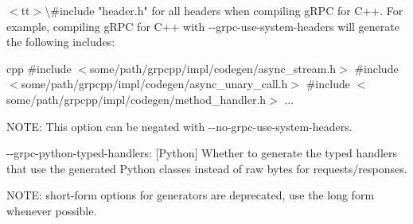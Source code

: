 \begin{DoxyItemize}
$<$tt$>$\textbackslash{}\#include "{}header.\+h"{} for all headers when compiling g\+RPC for C++. For example, compiling g\+RPC for C++ with {\ttfamily -\/-\/grpc-\/use-\/system-\/headers} will generate the following includes\+:

{\ttfamily cpp \#include \texorpdfstring{$<$}{<}some/path/grpcpp/impl/codegen/async\+\_\+stream.\+h\texorpdfstring{$>$}{>} \#include \texorpdfstring{$<$}{<}some/path/grpcpp/impl/codegen/async\+\_\+unary\+\_\+call.\+h\texorpdfstring{$>$}{>} \#include \texorpdfstring{$<$}{<}some/path/grpcpp/impl/codegen/method\+\_\+handler.\+h\texorpdfstring{$>$}{>} ... }

NOTE\+: This option can be negated with {\ttfamily -\/-\/no-\/grpc-\/use-\/system-\/headers}.
\item {\ttfamily -\/-\/grpc-\/python-\/typed-\/handlers}\+: {\ttfamily \mbox{[}Python\mbox{]}} Whether to generate the typed handlers that use the generated Python classes instead of raw bytes for requests/responses.
\end{DoxyItemize}

NOTE\+: short-\/form options for generators are deprecated, use the long form whenever possible. 